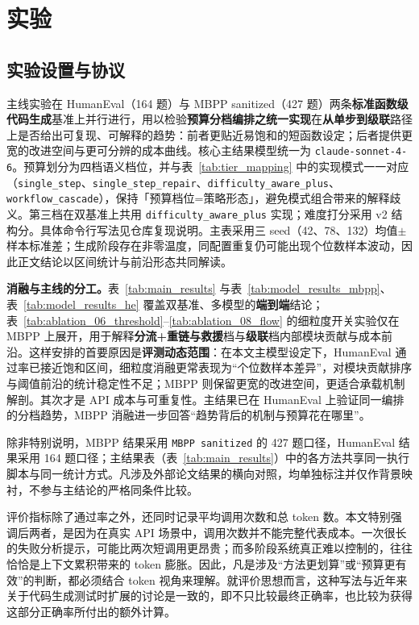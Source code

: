 \section{实验}
\subsection{实验设置与协议}

主线实验在 HumanEval（164 题）与 MBPP sanitized（427 题）两条\textbf{标准函数级代码生成}基准上并行进行，用以检验\textbf{预算分档编排之统一实现}在\textbf{从单步到级联}路径上是否给出可复现、可解释的趋势：前者更贴近易饱和的短函数设定；后者提供更宽的改进空间与更可分辨的成本曲线。核心主结果模型统一为 \texttt{claude-sonnet-4-6}。预算划分为四档语义档位，并与表~\ref{tab:tier_mapping} 中的实现模式一一对应（\texttt{single\_step}、\texttt{single\_step\_repair}、\texttt{difficulty\_aware\_plus}、\texttt{workflow\_cascade}），保持「预算档位=策略形态」，避免模式组合带来的解释歧义\cite{chen2021evaluating,austin2021program}。第三档在双基准上共用 \texttt{difficulty\_aware\_plus} 实现；难度打分采用 v2 结构分。具体命令行写法见仓库复现说明。主表采用三 seed（42、78、132）均值$\pm$样本标准差；生成阶段存在非零温度，同配置重复仍可能出现个位数样本波动，因此正文结论以区间统计与前沿形态共同解读。

\textbf{消融与主线的分工。}表~\ref{tab:main_results} 与表~\ref{tab:model_results_mbpp}、表~\ref{tab:model_results_he} 覆盖双基准、多模型的\textbf{端到端}结论；表~\ref{tab:ablation_06_threshold}--\ref{tab:ablation_08_flow} 的细粒度开关实验仅在 MBPP 上展开，用于解释\textbf{分流+重链与救援}档与\textbf{级联}档内部模块贡献与成本前沿。这样安排的首要原因是\textbf{评测动态范围}：在本文主模型设定下，HumanEval 通过率已接近饱和区间，细粒度消融更常表现为“个位数样本差异”，对模块贡献排序与阈值前沿的统计稳定性不足；MBPP 则保留更宽的改进空间，更适合承载机制解剖。其次才是 API 成本与可重复性。主结果已在 HumanEval 上验证同一编排的分档趋势，MBPP 消融进一步回答“趋势背后的机制与预算花在哪里”。

除非特别说明，MBPP 结果采用 \texttt{MBPP sanitized} 的 427 题口径，HumanEval 结果采用 164 题口径；主结果表（表~\ref{tab:main_results}）中的各方法共享同一执行脚本与同一统计方式。凡涉及外部论文结果的横向对照，均单独标注并仅作背景映衬，不参与主结论的严格同条件比较。

评价指标除了通过率之外，还同时记录平均调用次数和总 token 数。本文特别强调后两者，是因为在真实 API 场景中，调用次数并不能完整代表成本。一次很长的失败分析提示，可能比两次短调用更昂贵；而多阶段系统真正难以控制的，往往恰恰是上下文累积带来的 token 膨胀。因此，凡是涉及“方法更划算”或“预算更有效”的判断，都必须结合 token 视角来理解。就评价思想而言，这种写法与近年来关于代码生成测试时扩展的讨论是一致的，即不只比较最终正确率，也比较为获得这部分正确率所付出的额外计算\cite{li2022alphacode,li2025sstar}。

